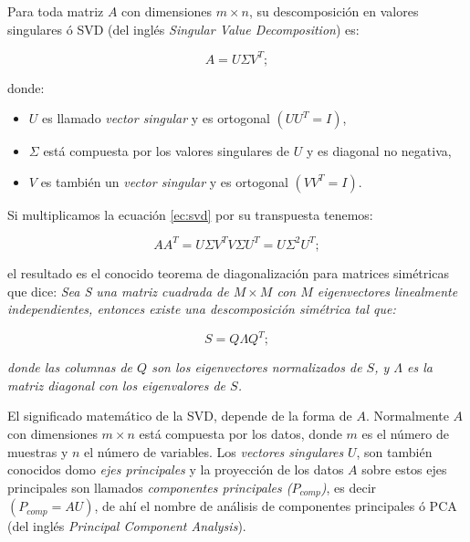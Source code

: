 Para toda matriz $A$ con dimensiones $m\times n$, su descomposición en valores singulares ó SVD (del inglés \textit{Singular Value Decomposition}) es:

\begin{equation}\label{ec:svd}
  \displaystyle A=U\Sigma V^{T};
\end{equation}

\noindent donde:\\

\begin{itemize}
  \item $U$ es llamado \textit{vector singular} y es ortogonal $(UU^{T}=I)$,
  \item $\Sigma$ está compuesta por los valores singulares de $U$ y es diagonal no negativa,
  \item $V$ es también un \textit{vector singular} y es ortogonal $(VV^{T}=I)$.
\end{itemize}

Si multiplicamos la ecuación \ref{ec:svd} por su transpuesta tenemos:

\begin{equation}
  \displaystyle AA^{T}=U\Sigma V^{T} V\Sigma U^{T} = U \Sigma^{2} U^{T};
\end{equation}

\noindent el resultado es el conocido teorema de diagonalización para matrices simétricas que dice: \textit{Sea S una matriz cuadrada de $M\times M$ con $M$ eigenvectores linealmente independientes, entonces existe una descomposición simétrica tal que:}

\begin{equation*}
  \displaystyle S=Q\Lambda Q^{T};
\end{equation*}


\noindent \textit{donde las columnas de $Q$ son los eigenvectores normalizados de $S$, y $\Lambda$ es la matriz diagonal con los eigenvalores de $S$.}

El significado matemático de la SVD, depende de la forma de $A$. Normalmente $A$ con dimensiones $m\times n$ está compuesta por los datos, donde $m$ es el número de muestras y $n$ el número de variables. Los \textit{vectores singulares} $U$, son también conocidos domo \textit{ejes principales} y la proyección de los datos $A$ sobre estos ejes principales son llamados \textit{componentes principales ($P_{comp}$)}, es decir $(P_{comp}=AU)$, de ahí el nombre de análisis de componentes principales ó PCA (del inglés \textit{Principal Component Analysis}).

